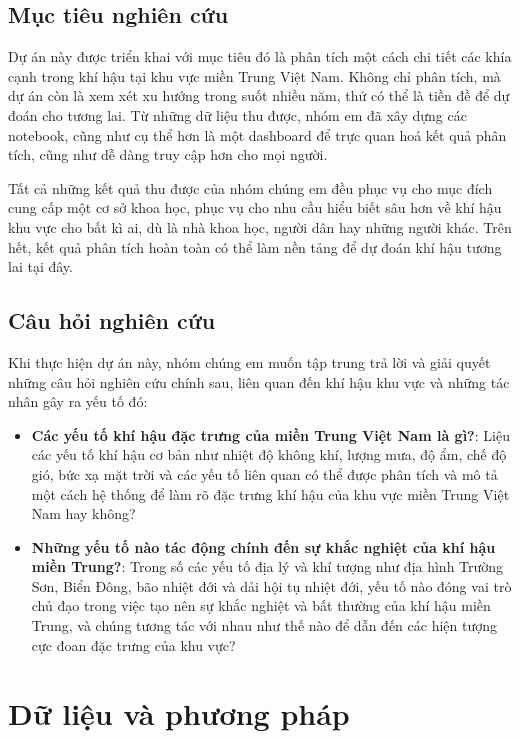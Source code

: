 \documentclass[12pt,a4paper]{article}
\begin{document}
\subsection{Mục tiêu nghiên cứu}

Dự án này được triển khai với mục tiêu đó là phân tích một cách chi tiết các khía cạnh trong khí hậu tại khu vực miền Trung Việt Nam. Không chỉ phân tích, mà dự án còn là xem xét xu hướng trong suốt nhiều năm, thứ có thể là tiền đề để dự đoán cho tương lai. Từ những dữ liệu thu được, nhóm em đã xây dựng các notebook, cũng như cụ thể hơn là một dashboard để trực quan hoá kết quả phân tích, cũng như dễ dàng truy cập hơn cho mọi người. 

Tất cả những kết quả thu được của nhóm chúng em đều phục vụ cho mục đích cung cấp một cơ sở khoa học, phục vụ cho nhu cầu hiểu biết sâu hơn về khí hậu khu vực cho bất kì ai, dù là nhà khoa học, người dân hay những người khác. Trên hết, kết quả phân tích hoàn toàn có thể làm nền tảng để dự đoán khí hậu tương lai tại đây.

\subsection{Câu hỏi nghiên cứu}

Khi thực hiện dự án này, nhóm chúng em muốn tập trung trả lời và giải quyết những câu hỏi nghiên cứu chính sau, liên quan đến khí hậu khu vực và những tác nhân gây ra yếu tố đó:

\begin{itemize}
    \item \textbf{Các yếu tố khí hậu đặc trưng của miền Trung Việt Nam là gì?}: Liệu các yếu tố khí hậu cơ bản như nhiệt độ không khí, lượng mưa, độ ẩm, chế độ gió, bức xạ mặt trời và các yếu tố liên quan có thể được phân tích và mô tả một cách hệ thống để làm rõ đặc trưng khí hậu của khu vực miền Trung Việt Nam hay không?
    \item \textbf{Những yếu tố nào tác động chính đến sự khắc nghiệt của khí hậu miền Trung?}: Trong số các yếu tố địa lý và khí tượng như địa hình Trường Sơn, Biển Đông, bão nhiệt đới và dải hội tụ nhiệt đới, yếu tố nào đóng vai trò chủ đạo trong việc tạo nên sự khắc nghiệt và bất thường của khí hậu miền Trung, và chúng tương tác với nhau như thế nào để dẫn đến các hiện tượng cực đoan đặc trưng của khu vực?
\end{itemize}

\section{Dữ liệu và phương pháp}
\end{document}
